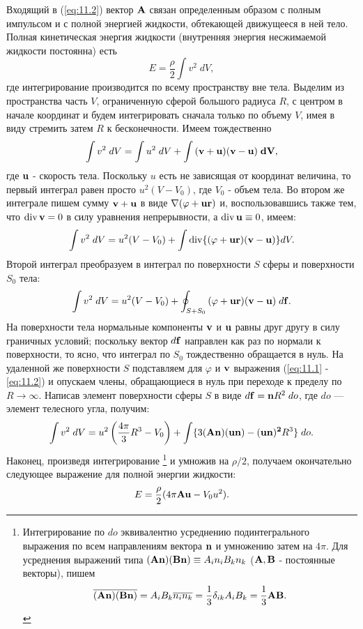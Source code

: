 Входящий в (\ref{eq:11.2}) вектор $\mathbf{A}$ связан определенным образом с полным
импульсом и с полной энергией жидкости, обтекающей движущееся в ней тело. Полная
кинетическая энергия жидкости (внутренняя энергия несжимаемой жидкости
постоянна) есть
\[
   E = \frac{\rho}{2}\int v^2\; dV,
\]
где интегрирование производится по всему пространству вне тела. Выделим из
пространства часть $V$, ограниченную сферой большого радиуса $R$, с центром в
начале координат и будем интегрировать сначала только по объему $V$, имея в виду
стремить затем $R$ к бесконечности. Имеем тождественно
\[
   \int v^2\; dV = \int u^2\; dV + \int \mathbf{(v+u)(v-u)\;dV},
\]
где $\mathbf{u}$ - скорость тела. Поскольку $u$ есть не зависящая от координат
величина, то первый интеграл равен просто $u^2(V-V_0)$, где $V_0$ - объем тела.
Во втором же интеграле пишем сумму $\mathbf{v+u}$ в виде
$\nabla(\varphi+\mathbf{ur})$ и, воспользовавшись также тем, что $\mathop{\mathrm{div}}\nolimits { \mathbf{v} } =0$ в
силу уравнения непрерывности, а $\mathop{\mathrm{div}}\nolimits \mathbf{u} \equiv 0$, имеем:
\[
   \int v^2\; dV = u^2(V-V_0) + \int \mathop{\mathrm{div}}\nolimits \lbrace \mathbf{(\varphi + ur)(v-u)} \rbrace dV.
\]
Второй интеграл преобразуем в интеграл по поверхности $S$ сферы и поверхности $S_0$
тела:
\[
   \int v^2\; dV = u^2(V-V_0) + \oint_{S+S_0} \mathbf{(\varphi+ur)(v-u)}\;d\mathbf{f} .
\]
На поверхности тела нормальные компоненты ${\mathbf{v}}$ и $\mathbf{u}$ равны друг другу в
силу граничных условий; поскольку вектор $d\mathbf{f}$ направлен как раз по нормали к
поверхности, то ясно, что интеграл по $S_0$ тождественно обращается в нуль. На
удаленной же поверхности $S$ подставляем для $\varphi$ и ${\mathbf{v}}$ выражения
(\ref{eq:11.1} - \ref{eq:11.2}) и опускаем члены, обращающиеся в нуль при переходе к пределу по $R \to
\infty$. Написав элемент поверхности сферы $S$ в виде $d\mathbf{f} = \mathbf{n} R^2\; do$,
где $do$ — элемент телесного угла, получим:
\[
   \int v^2\; dV = u^2 \left( \frac{4\pi}{3}R^3 - V_0 \right) +
   \int \lbrace 3 \mathbf{(An)(un) - (un)^2}R^3 \rbrace\; do .
\]
Наконец, произведя интегрирование
\footnote{
Интегрирование по $do$ эквивалентно усреднению подинтегрального выражения по всем
направлениям вектора $\mathbf{n}$ и умножению затем на $4\pi$. Для усреднения выражений
типа $(\mathbf{An})(\mathbf{Bn}) \equiv A_i n_i B_k n_k$ ($\mathbf{A,B}$ - постоянные векторы),
пишем
\[
\overline{\mathbf{(An)(Bn)}} = A_i B_k \overline{n_i n_k} =
\frac1{3} \delta_{ik} A_i B_k = \frac1{3}\mathbf{AB}.
\]
}
и умножив на $\rho/2$, получаем окончательно
следующее выражение для полной энергии жидкости:
\begin{equation}
   \label{eq:11.3}
   E = \frac{\rho}{2}(4\pi \mathbf{Au} - V_0 u^2) .
\end{equation}

